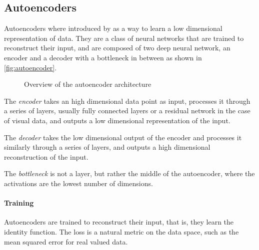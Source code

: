 \documentclass[]{scrarticle}
\begin{document}
\subsection{Autoencoders}

Autoencoders where introduced by \cite{hinton2006reducing} as a way to learn
a low dimensional representation of data.
They are a class of neural networks that are trained to reconstruct their input,
and are composed of two deep neural network, an encoder and a decoder with a bottleneck in between
as shown in \autoref{fig:autoencoder}.

\begin{figure}[h]
  \centering
  \caption{Overview of the autoencoder architecture}
  \label{fig:autoencoder}
\end{figure}

The \emph{encoder} takes an high dimensional data point as input,
processes it through a series of layers, usually fully connected layers
or a residual network \cite{He2015DeepRL} in the case of visual data,
and outputs a low dimensional representation of the input.

The \emph{decoder} takes the low dimensional output of the encoder and
processes it similarly through a series of layers,
and outputs a high dimensional reconstruction of the input.

The \emph{bottleneck} is not a layer, but rather the middle of the autoencoder,
where the activations are the lowest number of dimensions.

\paragraph{Training}
Autoencoders are trained to reconstruct their input,
that is, they learn the identity function. The loss is a natural metric
on the data space, such as the mean squared error for real valued data.
\end{document}
